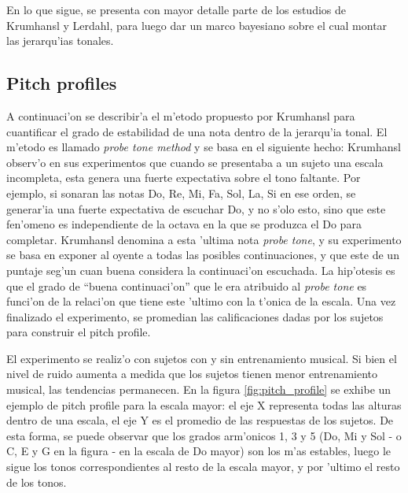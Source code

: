 En lo que sigue, se presenta con mayor detalle parte de los estudios de Krumhansl y Lerdahl, para luego dar un marco bayesiano sobre el cual montar las jerarqu'ias tonales.

\subsection{Pitch profiles}
\label{sec:pitch_profile}
A continuaci'on se describir'a el m'etodo propuesto por Krumhansl para cuantificar el grado de estabilidad de una nota dentro de la jerarqu'ia tonal. 
El m'etodo es llamado \emph{probe tone method} y se basa en el siguiente hecho: Krumhansl observ'o en sus experimentos que cuando se presentaba a un sujeto una escala 
incompleta, esta genera una fuerte expectativa sobre el tono faltante. Por ejemplo, si sonaran las notas Do, Re, Mi, Fa, Sol, La, Si en ese orden, se generar'ia una fuerte 
expectativa de escuchar Do, y no s'olo esto, sino que este fen'omeno es independiente de la octava en la que se produzca el Do para completar.
Krumhansl denomina a esta 'ultima nota \emph{probe tone}, y su experimento se basa en exponer al oyente a todas las posibles continuaciones, y que este de un puntaje
seg'un cuan buena considera la continuaci'on escuchada. La hip'otesis es que el grado de ``buena continuaci'on'' que le era atribuido al \emph{probe tone} es funci'on
de la relaci'on que tiene este 'ultimo con la t'onica de la escala.
Una vez finalizado el experimento, se promedian las calificaciones dadas por los sujetos para construir el pitch profile.

El experimento se realiz'o con sujetos con y sin entrenamiento musical. Si bien el nivel de ruido aumenta a medida que los sujetos 
tienen menor entrenamiento musical, las tendencias permanecen. En la figura \ref{fig:pitch_profile} se exhibe un ejemplo de pitch profile para la escala mayor: 
el eje X representa todas las alturas dentro de una escala, el eje Y es el promedio de las respuestas de los sujetos. De esta forma, se puede observar que los grados arm'onicos
1, 3 y 5 (Do, Mi y Sol - o C, E y G en la figura - en la escala de Do mayor) son los m'as estables, luego le sigue los tonos correspondientes al resto de la escala mayor, y por 'ultimo el resto de los 
tonos.


\begin{imagen}
    \width{10cm}
\end{imagen}


